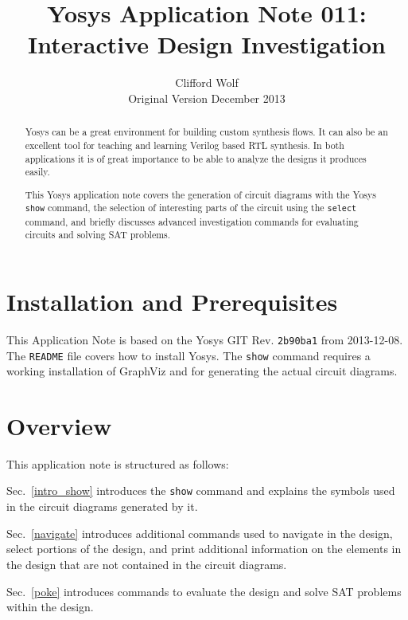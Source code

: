 \documentclass[9pt,technote,a4paper]{IEEEtran}
\begin{document}
\title{Yosys Application Note 011: \\ Interactive Design Investigation}
\author{Clifford Wolf \\ Original Version December 2013}
\maketitle

\begin{abstract}
Yosys \cite{yosys} can be a great environment for building custom synthesis
flows. It can also be an excellent tool for teaching and learning Verilog based
RTL synthesis. In both applications it is of great importance to be able to
analyze the designs it produces easily.

This Yosys application note covers the generation of circuit diagrams with the
Yosys {\tt show} command, the selection of interesting parts of the circuit
using the {\tt select} command, and briefly discusses advanced investigation
commands for evaluating circuits and solving SAT problems.
\end{abstract}

\section{Installation and Prerequisites}

This Application Note is based on the Yosys \cite{yosys} GIT Rev. {\tt 2b90ba1} from
2013-12-08. The {\tt README} file covers how to install Yosys. The
{\tt show} command requires a working installation of GraphViz \cite{graphviz}
and \cite{xdot} for generating the actual circuit diagrams.

\section{Overview}

This application note is structured as follows:

Sec.~\ref{intro_show} introduces the {\tt show} command and explains the
symbols used in the circuit diagrams generated by it.

Sec.~\ref{navigate} introduces additional commands used to navigate in the
design, select portions of the design, and print additional information on
the elements in the design that are not contained in the circuit diagrams.

Sec.~\ref{poke} introduces commands to evaluate the design and solve SAT
problems within the design.
\end{document}
